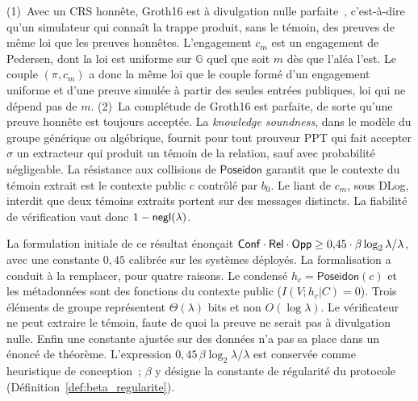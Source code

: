 \begin{sloppypar}
\begin{Preuve}
(1)~Avec un CRS honn\^ete, Groth16 est \`a divulgation nulle parfaite~\cite{Groth16},
c'est-\`a-dire qu'un simulateur qui conna\^it la trappe produit, sans le t\'emoin,
des preuves de m\^eme loi que les preuves honn\^etes. L'engagement $c_m$ est un
engagement de Pedersen, dont la loi est uniforme sur $\mathbb{G}$ quel que soit $m$
d\`es que l'al\'ea l'est. Le couple $(\pi, c_m)$ a donc la m\^eme loi que le couple
form\'e d'un engagement uniforme et d'une preuve simul\'ee \`a partir des seules
entr\'ees publiques, loi qui ne d\'epend pas de $m$. (2)~La compl\'etude de Groth16 est
parfaite, de sorte qu'une preuve honn\^ete est toujours accept\'ee. La
\emph{knowledge soundness}, dans le mod\`ele du groupe g\'en\'erique ou alg\'ebrique,
fournit pour tout prouveur PPT
qui fait accepter $\sigma$ un extracteur qui produit un t\'emoin de la relation, sauf
avec probabilit\'e n\'egligeable. La r\'esistance aux collisions de $\mathsf{Poseidon}$ garantit que
le contexte du t\'emoin extrait est le contexte public $c$ contr\^ol\'e par $b_0$. Le liant de $c_m$,
sous DLog, interdit que deux t\'emoins extraits portent sur des messages distincts. La fiabilit\'e de v\'erification
vaut donc $1 - \mathsf{negl}(\lambda)$.
\end{Preuve}

\begin{remark}
\label{rem:heuristique_sotp_high}
La formulation initiale de ce r\'esultat \'enon\c{c}ait
$\mathsf{Conf} \cdot \mathsf{Rel} \cdot \mathsf{Opp} \geq 0{,}45 \cdot \beta\log_2\lambda/\lambda$, avec une
constante $0{,}45$ \og calibr\'ee\fg{} sur les syst\`emes d\'eploy\'es. La formalisation a
conduit \`a la remplacer, pour quatre raisons. Le condens\'e $h_c = \mathsf{Poseidon}(c)$ et les
m\'etadonn\'ees sont des fonctions du contexte public ($I(V;h_c|C) = 0$). Trois
\'el\'ements de groupe repr\'esentent $\Theta(\lambda)$ bits et non $O(\log\lambda)$. Le
v\'erificateur ne peut extraire le t\'emoin, faute de quoi la preuve ne serait
pas \`a divulgation nulle. Enfin une constante ajust\'ee sur des donn\'ees n'a pas sa place
dans un \'enonc\'e de th\'eor\`eme. L'expression $0{,}45\,\beta\log_2\lambda/\lambda$ est
conserv\'ee comme heuristique de conception~; $\beta$ y d\'esigne la constante de
r\'egularit\'e du protocole (D\'efinition~\ref{def:beta_regularite}).
\end{remark}


\end{sloppypar}
